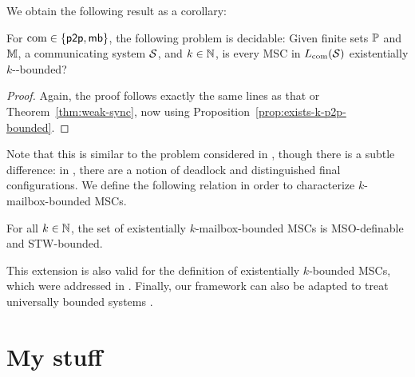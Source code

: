 \documentclass{article}
\begin{document}
We obtain the following result as a corollary:

\begin{theorem}\label{thm:exists-sync}
For $\textup{com} \in \{\mathsf{p2p}, \mathsf{mb}\}$, the following problem is decidable:
Given finite sets $\mathbb{P}$ and $\mathbb{M}$, a communicating system $\mathcal{S}$, and $k \in \mathbb{N}$,
is every MSC in $L_{\textup{com}}(\mathcal{S})$ existentially $k$-\pp-bounded?
\end{theorem}

\begin{proof}
Again, the proof follows exactly the same lines as that or Theorem~\ref{thm:weak-sync},
now using Proposition~\ref{prop:exists-k-p2p-bounded}.
\end{proof}

Note that this is similar to the problem considered
in \cite{GKM07,kuske2014communicating},
though there is a subtle difference: in \cite{GKM07,kuske2014communicating},
there are a notion of deadlock and distinguished final configurations.
We define the following relation in order to characterize $k$-mailbox-bounded MSCs.


\begin{proposition}\label{prop:exist-k-mailbox-bounded}
	For all $k \in \mathbb{N}$, the set of existentially $k$-mailbox-bounded MSCs
	is MSO-definable and STW-bounded.
\end{proposition}



This extension is also valid for the \pp definition of existentially $k$-bounded MSCs, which
were addressed in \cite{GKM07}. Finally, our framework can also be adapted to treat universally bounded systems \cite{HENRIKSEN20051,DBLP:conf/fossacs/LohreyM02}.

\section{My stuff}


\end{document}
